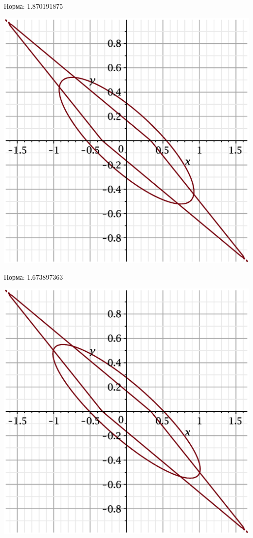 \documentclass{beamer}
\begin{document}
\begin{frame}
Норма: 1.870191875
    \begin{center}
        \includegraphics[scale=0.4]{pictures/2.eps}
    \end{center}
\end{frame}

\begin{frame}
Норма: 1.673897363
    \begin{center}
        \includegraphics[scale=0.4]{pictures/3.eps}
    \end{center}
\end{frame}
\end{document}
